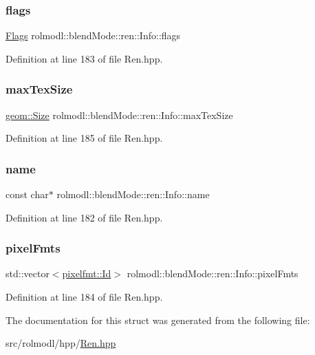 \subsubsection{\texorpdfstring{flags}{flags}}
{\footnotesize\ttfamily \mbox{\hyperlink{structrolmodl_1_1blend_mode_1_1ren_1_1_flags}{Flags}} rolmodl\+::blend\+Mode\+::ren\+::\+Info\+::flags}



Definition at line 183 of file Ren.\+hpp.

\mbox{\label{structrolmodl_1_1blend_mode_1_1ren_1_1_info_a772876f3b50dac2375cb5f2661fd0489}} 
\subsubsection{\texorpdfstring{maxTexSize}{maxTexSize}}
{\footnotesize\ttfamily \mbox{\hyperlink{structrolmodl_1_1geom_1_1_size}{geom\+::\+Size}} rolmodl\+::blend\+Mode\+::ren\+::\+Info\+::max\+Tex\+Size}



Definition at line 185 of file Ren.\+hpp.

\mbox{\label{structrolmodl_1_1blend_mode_1_1ren_1_1_info_aa769a93854007312ff42d437072c8197}} 
\subsubsection{\texorpdfstring{name}{name}}
{\footnotesize\ttfamily const char$\ast$ rolmodl\+::blend\+Mode\+::ren\+::\+Info\+::name}



Definition at line 182 of file Ren.\+hpp.

\mbox{\label{structrolmodl_1_1blend_mode_1_1ren_1_1_info_ad513d03521e009966f3687f6280f362c}} 
\subsubsection{\texorpdfstring{pixelFmts}{pixelFmts}}
{\footnotesize\ttfamily std\+::vector$<$\mbox{\hyperlink{namespacerolmodl_1_1pixelfmt_a96282713e4465ba9211c8fd3a702b52b}{pixelfmt\+::\+Id}}$>$ rolmodl\+::blend\+Mode\+::ren\+::\+Info\+::pixel\+Fmts}



Definition at line 184 of file Ren.\+hpp.



The documentation for this struct was generated from the following file\+:\begin{DoxyCompactItemize}
\item 
src/rolmodl/hpp/\mbox{\hyperlink{_ren_8hpp}{Ren.\+hpp}}\end{DoxyCompactItemize}
